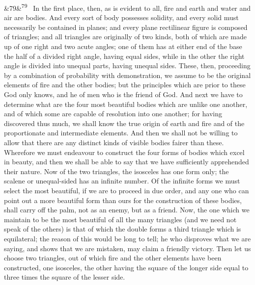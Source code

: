 \documentclass[12pt]{article}
\newcommand{\para}[1][]{\par\noindent\ifx&#1&\else\textsuperscript{\footnotesize #1}~\fi}
\begin{document}
\para[79] In the first place, then, as is evident to all, fire and earth and water and air are bodies. And every sort of body possesses solidity, and every solid must necessarily be contained in planes; and every plane rectilinear figure is composed of triangles; and all triangles are originally of two kinds, both of which are made up of one right and two acute angles; one of them has at either end of the base the half of a divided right angle, having equal sides, while in the other the right angle is divided into unequal parts, having unequal sides. These, then, proceeding by a combination of probability with demonstration, we assume to be the original elements of fire and the other bodies; but the principles which are prior to these God only knows, and he of men who is the friend of God. And next we have to determine what are the four most beautiful bodies which are unlike one another, and of which some are capable of resolution into one another; for having discovered thus much, we shall know the true origin of earth and fire and of the proportionate and intermediate elements. And then we shall not be willing to allow that there are any distinct kinds of visible bodies fairer than these. Wherefore we must endeavour to construct the four forms of bodies which excel in beauty, and then we shall be able to say that we have sufficiently apprehended their nature. Now of the two triangles, the isosceles has one form only; the scalene or unequal-sided has an infinite number. Of the infinite forms we must select the most beautiful, if we are to proceed in due order, and any one who can point out a more beautiful form than ours for the construction of these bodies, shall carry off the palm, not as an enemy, but as a friend. Now, the one which we maintain to be the most beautiful of all the many triangles (and we need not speak of the others) is that of which the double forms a third triangle which is equilateral; the reason of this would be long to tell; he who disproves what we are saying, and shows that we are mistaken, may claim a friendly victory. Then let us choose two triangles, out of which fire and the other elements have been constructed, one isosceles, the other having the square of the longer side equal to three times the square of the lesser side.
\end{document}
